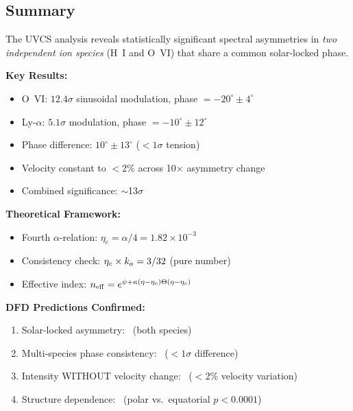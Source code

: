 \subsection{Summary}\label{sec:uvcs-summary}

The UVCS analysis reveals statistically significant spectral asymmetries in 
\emph{two independent ion species} (H~I and O~VI) that share a common solar-locked phase.

\vspace{0.5em}
\begin{tcolorbox}[colback=blue!5!white, colframe=blue!50!black, title=UVCS Analysis Summary, float=h]
\textbf{Key Results:}
\begin{itemize}[nosep]
\item O~VI: $12.4\sigma$ sinusoidal modulation, phase $= -20^\circ \pm 4^\circ$
\item Ly-$\alpha$: $5.1\sigma$ modulation, phase $= -10^\circ \pm 12^\circ$
\item Phase difference: $10^\circ \pm 13^\circ$ ($<1\sigma$ tension)
\item Velocity constant to $<$2\% across 10$\times$ asymmetry change
\item Combined significance: $\sim$13$\sigma$
\end{itemize}
\textbf{Theoretical Framework:}
\begin{itemize}[nosep]
\item Fourth $\alpha$-relation: $\eta_c = \alpha/4 = 1.82 \times 10^{-3}$
\item Consistency check: $\eta_c \times k_a = 3/32$ (pure number)
\item Effective index: $n_{\rm eff} = e^{\psi + \kappa(\eta - \eta_c)\Theta(\eta - \eta_c)}$
\end{itemize}
\textbf{DFD Predictions Confirmed:}
\begin{enumerate}[nosep]
\item Solar-locked asymmetry: \checkmark\ (both species)
\item Multi-species phase consistency: \checkmark\ ($<1\sigma$ difference)
\item Intensity WITHOUT velocity change: \checkmark\ ($<$2\% velocity variation)
\item Structure dependence: \checkmark\ (polar vs.\ equatorial $p < 0.0001$)
\end{enumerate}
\end{tcolorbox}

